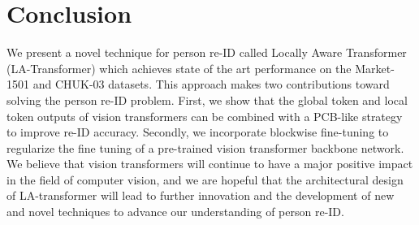 \documentclass{article}
\begin{document}
\section{Conclusion}
We present a novel technique for person re-ID called Locally Aware Transformer (LA-Transformer) which achieves state of the art performance on the Market-1501 and CHUK-03 datasets.  This approach makes two contributions toward solving the person re-ID problem. First, we show that the global token and local token outputs of vision transformers can be combined with a PCB-like strategy to improve re-ID accuracy.  Secondly, we incorporate blockwise fine-tuning to regularize the fine tuning of a pre-trained vision transformer backbone network.  We believe that vision transformers will continue to have a major positive impact in the field of computer vision, and we are hopeful that the architectural design of LA-transformer will lead to further innovation and the development of new and novel techniques to advance our understanding of person re-ID.

{
\small


}
\end{document}
